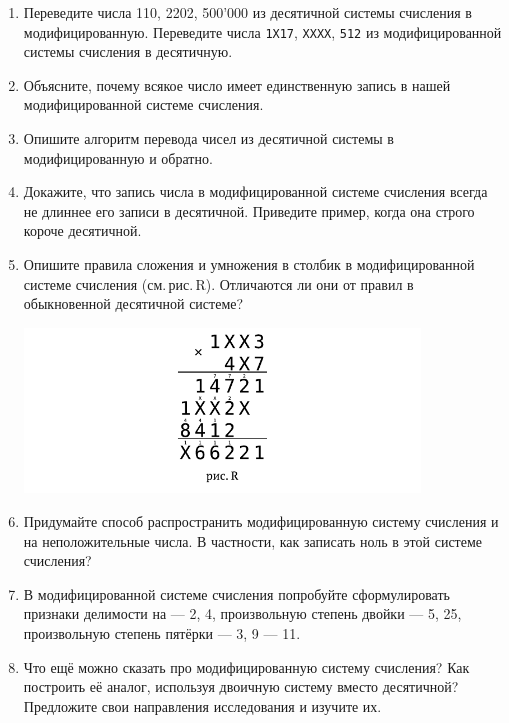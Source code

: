 \begin{enumerate}

\item Переведите числа 110, 2202, 500'000 из десятичной системы счисления в модифицированную. Переведите числа {\tt 1X17}, {\tt XXXX}, {\tt 512} из модифицированной системы счисления в десятичную.

\item Объясните, почему всякое число имеет единственную запись в нашей модифицированной системе счисления.

\item Опишите алгоритм перевода чисел из десятичной системы в модифицированную и обратно.

\item Докажите, что запись числа в модифицированной системе счисления всегда не длиннее его записи в десятичной. Приведите пример, когда она строго короче десятичной.

\item Опишите правила сложения и умножения в столбик в модифицированной системе счисления (см.\,рис.\,R). Отличаются ли они от правил в обыкновенной десятичной системе?

\vspace{-0.3cm}
\begin{center}
\includegraphics[width=10.5cm]{images/stolbik.pdf}
\end{center} \vspace{-0.7cm}

\item Придумайте способ распространить модифицированную систему счисления и на неположительные числа. В частности, как записать ноль в этой системе счисления?

\item В модифицированной системе счисления попробуйте сформулировать признаки делимости на
\subitem — 2, 4, произвольную степень двойки\scolon
\subitem — 5, 25, произвольную степень пятёрки\scolon
\subitem — 3, 9\scolon
\subitem — 11.

\item Что ещё можно сказать про модифицированную систему счисления? Как построить её аналог, используя двоичную систему вместо десятичной? Предложите свои направления исследования и изучите их.
\end{enumerate}